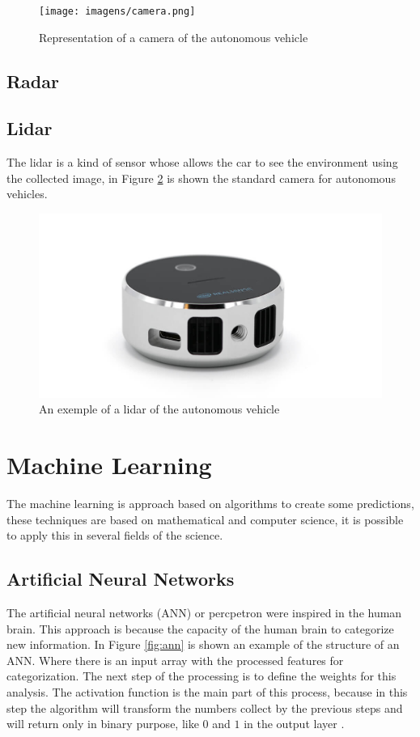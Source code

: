 \begin{figure}[H]
\centering
\texttt{[image: imagens/camera.png]}
\caption{Representation of a camera of the autonomous vehicle}
\label{fig:camera}
\end{figure}

\subsection{Radar}
\subsection{Lidar}
The lidar is a kind of sensor whose allows the car to see the environment using the collected image, in Figure \ref{fig:lidar} is shown the standard camera for autonomous vehicles. 

\begin{figure}[H]
\centering
\includegraphics[width=\columnwidth]{imagens/lidar.jpg}
\caption{An exemple of a lidar of the autonomous vehicle}
\label{fig:lidar}
\end{figure}

\section{Machine Learning}\label{ml-ai}
The machine learning is approach based on algorithms to create some predictions, these techniques are based on mathematical and computer science, it is possible to apply this in several fields of the science. 
\subsection{Artificial Neural Networks}

The artificial neural networks (ANN) or percpetron were inspired in the human brain. This approach is because the capacity of the human brain to categorize new information. In Figure \ref{fig:ann} is shown an example of the structure of an ANN. Where there is an input array with the processed features for categorization. The next step of the processing is to define the weights for this analysis. The activation function is the main part of this process, because in this step the algorithm will transform the numbers collect by the previous steps and will return only in binary purpose, like $0$ and $1$ in the output layer \cite{goodfellow2016deep}.

